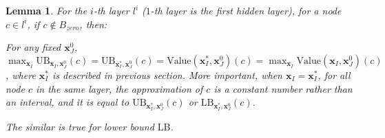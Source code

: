 \documentclass[]{article}
\newtheorem{lemma}{Lemma}
\theoremstyle{definition}
\newcommand{\Val}{\mathrm{Value}}
\newcommand{\UB}{\mathrm{UB}}
\newcommand{\LB}{\mathrm{LB}}
\begin{document}
\begin{lemma}
	For the $i$-th layer $l^i$ ($1$-th layer is the first hidden layer), for a node $c\in l^i$, if $c\notin B_{zero}$, then:
	
	 For any fixed $\boldsymbol{x}^0_J$, $\max_{\boldsymbol{x}_I} \UB_{\boldsymbol{x}_I,\boldsymbol{x}^0_J}(c)=\UB_{\boldsymbol{x}^*_I,\boldsymbol{x}^0_J}(c)= \Val(\boldsymbol{x}^*_I,\boldsymbol{x}^0_J)(c) = \max_{\boldsymbol{x}_I} \Val(\boldsymbol{x}_I,\boldsymbol{x}^0_J)(c)$, where $\boldsymbol{x}^*_I$ is described in previous section. More important, when $\boldsymbol{x}_I=\boldsymbol{x}^*_I$, for all node $c$ in the same layer, the approximation of $c$ is a constant number rather than an interval, and it is equal to $\UB_{\boldsymbol{x}^*_I,\boldsymbol{x}^0_J}(c)$ or $\LB_{\boldsymbol{x}^*_I,\boldsymbol{x}^0_J}(c)$.
	
The similar is true for lower bound $\LB$.
\end{lemma}
\end{document}
